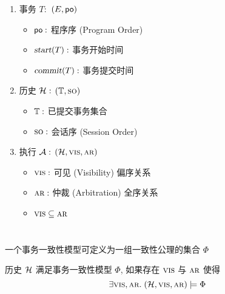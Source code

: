 
\begin{frame}{}
\end{frame}

\begin{frame}{}
  \begin{columns}
	  \begin{enumerate}
	  	\setlength{\itemsep}{12pt}
	  	\item 事务 $T:$ $(E, {\sf po})$
	  	  \begin{itemize}
	  	    \setlength{\itemsep}{2pt}
	  	    \item ${\sf po}:$ 程序序 (Program Order)
	  	    \item $\textsl{start}(T):$ 事务开始时间
	  	    \item $\textsl{commit}(T):$ 事务提交时间
	  	  \end{itemize}
	  	\item 历史 $\mathcal{H}:$ $(\mathbb{T}, \textsc{so})$
	  	  \begin{itemize}
	  	    \setlength{\itemsep}{2pt}
			\item $\mathbb{T}:$ 已提交事务集合
	  	  	\item $\textsc{so}:$ 会话序 (Session Order)
	  	  \end{itemize}
	  	\item 执行 $\mathcal{A}:$ $(\mathcal{H}, \textsc{vis}, \textsc{ar})$
	  	  \begin{itemize}
	  	  	\setlength{\itemsep}{2pt}
	  	  	\item $\textsc{vis}:$ 可见 (Visibility) 偏序关系
	  	  	\item $\textsc{ar}:$ 仲裁 (Arbitration) 全序关系
	  	  	\item $\textsc{vis} \subseteq \textsc{ar}$
	  	  \end{itemize}
	  \end{enumerate}
  \end{columns}
\end{frame}

\begin{frame}{}
  \begin{center}
	一个事务一致性模型可定义为一组一致性公理的集合 $\Phi$

	\vspace{0.80cm}
	历史 $\mathcal{H}$ 满足事务一致性模型 $\Phi$,
	如果存在 $\textsc{vis}$ 与 $\textsc{ar}$ 使得
	\[
	  \exists \textsc{vis}, \textsc{ar}.\; (\mathcal{H}, \textsc{vis}, \textsc{ar}) \models \Phi
	\]
  \end{center}
\end{frame}

